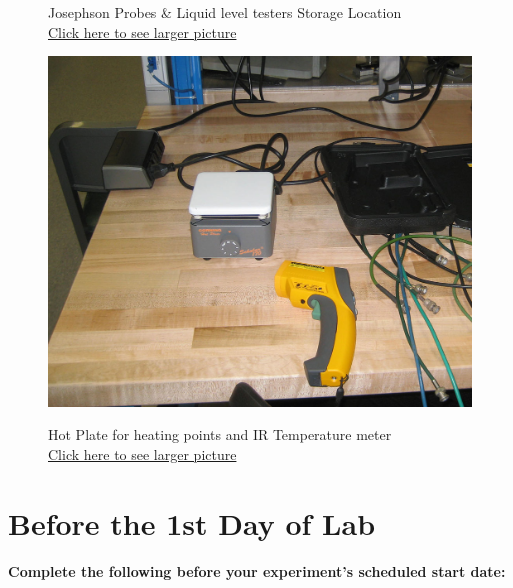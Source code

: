 \documentclass{../lab}
\begin{document}
\begin{figure}[!htb]
  \caption{Josephson Probes \& Liquid level testers Storage Location \\ \href{http://experimentationlab.berkeley.edu/sites/default/files/images/JOS-Probes_3506.jpg}{Click here to see larger picture}}\label{fig:JOS-Probes_3506.jpg}
\endminipage\hfill
{}
  \href{http://experimentationlab.berkeley.edu/sites/default/files/images/HotPlate-JOS_3505-Lg.jpg}{\includegraphics[width=\linewidth,keepaspectratio]{images/HotPlate-JOS_3505-Lg.jpg}}
  \caption{Hot Plate for heating points and IR Temperature meter \\ \href{http://experimentationlab.berkeley.edu/sites/default/files/images/HotPlate-JOS_3505-Lg.jpg}{Click here to see larger picture}}\label{fig:HotPlate-JOS_3505-Lg.jpg}
\endminipage
\end{figure}

\section{Before the 1st Day of Lab}

\textbf{Complete the following before your experiment's scheduled start date:}
\end{document}
